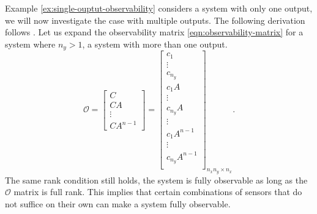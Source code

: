 Example \ref{ex:single-ouptut-observability} considers a system with only one output, we will now investigate the case with multiple outputs. The following derivation follows \cite[Section 3.4 D 2]{Antsaklis2006LinearProcessing}. Let us expand the observability matrix \eqref{eqn:observability-matrix} for a system where $n_y>1$, a system with more than one output.
\begin{equation*}
\mathcal{O}=
\begin{bmatrix}
    C \\
    CA \\
    \vdots \\
    CA^{n-1}
\end{bmatrix}    
=
\begin{bmatrix}
    c_1 \\
    \vdots \\
    c_{n_y} \\
    c_1A \\
    \vdots \\
    c_{n_y}A \\
    \vdots \\
    c_1A^{n-1}\\
    \vdots \\
    c_{n_y}A^{n-1} \\
\end{bmatrix}_{n_xn_y \times n_x}.
\end{equation*}
The same rank condition still holds, the system is fully observable as long as the $\mathcal{O}$ matrix is full rank. This implies that certain combinations of sensors that do not suffice on their own can make a system fully observable.

